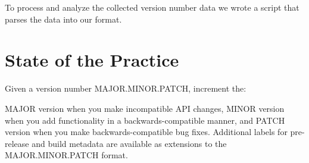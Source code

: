 \documentclass[conference]{IEEEtran}
\begin{document}
 
 
 To process and analyze the collected version number data we wrote a script that parses the data into our format. 










\section{State of the Practice}


Given a version number MAJOR.MINOR.PATCH, increment the:

MAJOR version when you make incompatible API changes,
MINOR version when you add functionality in a backwards-compatible manner, and
PATCH version when you make backwards-compatible bug fixes.
Additional labels for pre-release and build metadata are available as extensions to the MAJOR.MINOR.PATCH format.
\end{document}
